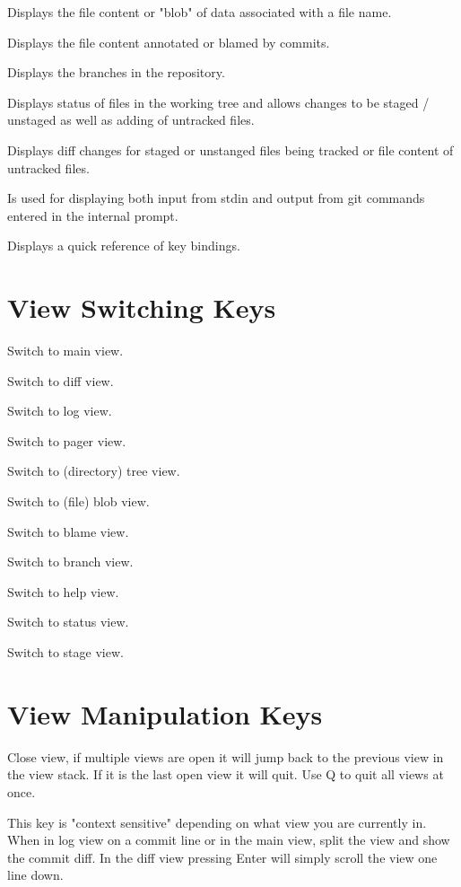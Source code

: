  {
Displays the file content or "blob" of data associated with a file name.}

 {
Displays the file content annotated or blamed by commits.}

 {
Displays the branches in the repository.}

 {
Displays status of files in the working tree and allows changes to be staged /
unstaged as well as adding of untracked files.}

 {
Displays diff changes for staged or unstanged files being tracked or file
content of untracked files.}

 {
Is used for displaying both input from stdin and output from git commands
entered in the internal prompt.}

 {
Displays a quick reference of key bindings.}


\vskip 1cm
\section{View Switching Keys}
 {Switch to main view.}

 {Switch to diff view.}

 {Switch to log view.}

 {Switch to pager view.}

 {Switch to (directory) tree view.}

 {Switch to (file) blob view.}

 {Switch to blame view.}

 {Switch to branch view.}

 {Switch to help view.}

 {Switch to status view.}

 {Switch to stage view.}


\section{View Manipulation Keys}
 {Close view, if multiple views are open it
               will jump back to the previous view in the
               view stack. If it is the last open view it
               will quit. Use Q to quit all views at once.}

 {This key is "context sensitive" depending on
               what view you are currently in. When in log
               view on a commit line or in the main view,
               split the view and show the commit diff. In
               the diff view pressing Enter will simply
               scroll the view one line down.}

